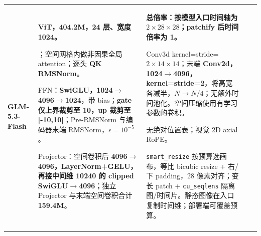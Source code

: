 \begin{longtable}{@{}P{0.130\dimexpr\textwidth-40pt\relax}P{0.235\dimexpr\textwidth-40pt\relax}P{0.300\dimexpr\textwidth-40pt\relax}P{0.245\dimexpr\textwidth-40pt\relax}P{0.090\dimexpr\textwidth-40pt\relax}@{}}
{\bfseries GLM-\allowbreak{}5.\allowbreak{}3-\allowbreak{}Flash} & {\bfseries ViT，404.\allowbreak{}2M，24 层、宽度 1024。}\par{}；空间网格内做非因果全局 attention；逐头 {\bfseries QK RMSNorm}。\par\vspace{1pt}FFN：{\bfseries SwiGLU，1024\(\rightarrow\)4096\(\rightarrow\)1024}，带 bias；{\bfseries gate 仅上界裁剪至 10，up 裁剪至 [-\allowbreak{}10,10]}；Pre-\allowbreak{}RMSNorm 与编码器末端 RMSNorm，\(\epsilon=10^{-5}\)。\par\vspace{1pt}Projector：空间卷积后 {\bfseries 4096\(\rightarrow\)4096，LayerNorm+GELU，再接中间维 10240 的 clipped SwiGLU\(\rightarrow\)4096}；独立 Projector 与末端空间卷积合计 {\bfseries 159.\allowbreak{}4M}。 & {\bfseries 总倍率：按模型入口时间轴为 \(2\times 28\times 28\)；patchify 后时间倍率为 1。}\par{}Conv3d kernel=\allowbreak{}stride=\allowbreak{}\(2\times 14\times 14\)；末端 {\bfseries Conv2d，1024\(\rightarrow\)4096，kernel=\allowbreak{}stride=\allowbreak{}2}，将高宽各减半，{\bfseries \(N\rightarrow N/4\)}；无额外时间池化。空间压缩使用有学习参数的卷积。\par\vspace{1pt}{\bfseries 位置：}无绝对位置表；视觉 2D axial RoPE。\par\vspace{1pt}{\bfseries 动态分辨率：是。} \texttt{smart\_\allowbreak{}resize} 按预算选画布，等比 bicubic resize + 右/\allowbreak{}下 padding，28 像素对齐；变长 patch + \texttt{cu\_\allowbreak{}seqlens} 隔离图/\allowbreak{}时间片。静态图像在入口复制时间维；部署端可覆盖预算。 & \textemdash{}\textemdash{} & \textemdash{}\textemdash{} \\
\addlinespace[6pt]

\end{longtable}
